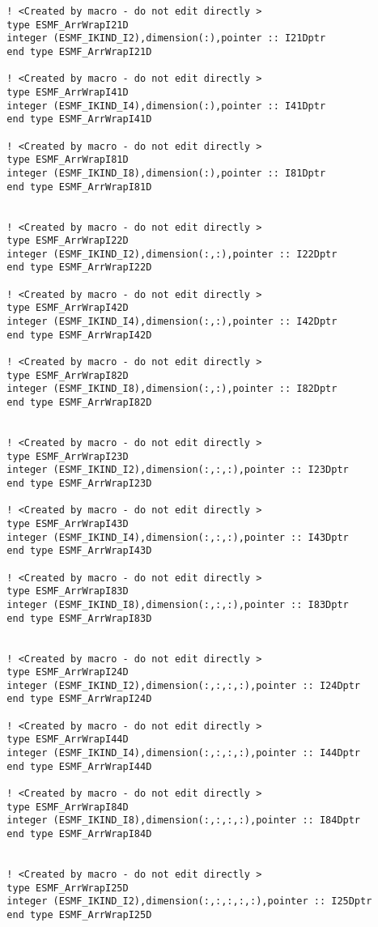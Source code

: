 \begin{verbatim}
  ! <Created by macro - do not edit directly > 
  type ESMF_ArrWrapI21D 
  integer (ESMF_IKIND_I2),dimension(:),pointer :: I21Dptr 
  end type ESMF_ArrWrapI21D 
  
  ! <Created by macro - do not edit directly > 
  type ESMF_ArrWrapI41D 
  integer (ESMF_IKIND_I4),dimension(:),pointer :: I41Dptr 
  end type ESMF_ArrWrapI41D 
  
  ! <Created by macro - do not edit directly > 
  type ESMF_ArrWrapI81D 
  integer (ESMF_IKIND_I8),dimension(:),pointer :: I81Dptr 
  end type ESMF_ArrWrapI81D 
  
  
  ! <Created by macro - do not edit directly > 
  type ESMF_ArrWrapI22D 
  integer (ESMF_IKIND_I2),dimension(:,:),pointer :: I22Dptr 
  end type ESMF_ArrWrapI22D 
  
  ! <Created by macro - do not edit directly > 
  type ESMF_ArrWrapI42D 
  integer (ESMF_IKIND_I4),dimension(:,:),pointer :: I42Dptr 
  end type ESMF_ArrWrapI42D 
  
  ! <Created by macro - do not edit directly > 
  type ESMF_ArrWrapI82D 
  integer (ESMF_IKIND_I8),dimension(:,:),pointer :: I82Dptr 
  end type ESMF_ArrWrapI82D 
  
  
  ! <Created by macro - do not edit directly > 
  type ESMF_ArrWrapI23D 
  integer (ESMF_IKIND_I2),dimension(:,:,:),pointer :: I23Dptr 
  end type ESMF_ArrWrapI23D 
  
  ! <Created by macro - do not edit directly > 
  type ESMF_ArrWrapI43D 
  integer (ESMF_IKIND_I4),dimension(:,:,:),pointer :: I43Dptr 
  end type ESMF_ArrWrapI43D 
  
  ! <Created by macro - do not edit directly > 
  type ESMF_ArrWrapI83D 
  integer (ESMF_IKIND_I8),dimension(:,:,:),pointer :: I83Dptr 
  end type ESMF_ArrWrapI83D 
  
  
  ! <Created by macro - do not edit directly > 
  type ESMF_ArrWrapI24D 
  integer (ESMF_IKIND_I2),dimension(:,:,:,:),pointer :: I24Dptr 
  end type ESMF_ArrWrapI24D 
  
  ! <Created by macro - do not edit directly > 
  type ESMF_ArrWrapI44D 
  integer (ESMF_IKIND_I4),dimension(:,:,:,:),pointer :: I44Dptr 
  end type ESMF_ArrWrapI44D 
  
  ! <Created by macro - do not edit directly > 
  type ESMF_ArrWrapI84D 
  integer (ESMF_IKIND_I8),dimension(:,:,:,:),pointer :: I84Dptr 
  end type ESMF_ArrWrapI84D 
  
  
  ! <Created by macro - do not edit directly > 
  type ESMF_ArrWrapI25D 
  integer (ESMF_IKIND_I2),dimension(:,:,:,:,:),pointer :: I25Dptr 
  end type ESMF_ArrWrapI25D 
  

\end{verbatim}
